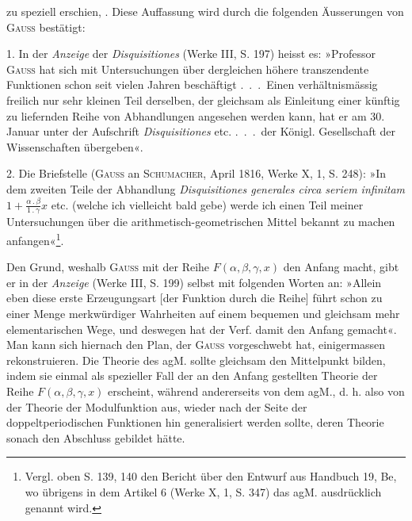 zu speziell erschien, . Diese Auffassung wird
durch die folgenden Äusserungen von \textsc{Gauss} bestätigt:
\par
1. In der \textit{Anzeige} der \textit{Disquisitiones} (Werke III, S. 197) heisst es: »Professor
\textsc{Gauss} hat sich mit Untersuchungen über dergleichen höhere transzendente
Funktionen schon seit vielen Jahren beschäftigt \mbox{.\ .\ .}\ Einen verhältnismässig
freilich nur sehr kleinen Teil derselben, der gleichsam als Einleitung
einer künftig zu liefernden Reihe von Abhandlungen angesehen werden
kann, hat er am 30. Januar unter der Aufschrift \textit{Disquisitiones} etc. \mbox{.\ .\ .}\ der
Königl. Gesellschaft der Wissenschaften übergeben«.
\par
2. Die Briefstelle (\textsc{Gauss} an \textsc{Schumacher}, April 1816, Werke X, 1, S. 248):
»In dem zweiten Teile der Abhandlung \textit{Disquisitiones generales circa seriem
infinitam} \(1+\frac{\alpha\mathbin{.}\beta}{1\mathbin{.}\gamma}x\) etc. (welche ich vielleicht bald gebe) werde ich einen Teil
meiner Untersuchungen über die arithmetisch-geometrischen Mittel bekannt
zu machen anfangen«\footnote{Vergl. oben S. 139, 140 den Bericht über den Entwurf aus Handbuch 19, Be, wo übrigens in dem Artikel 6 (Werke X, 1, S. 347) das agM. ausdrücklich genannt wird.}.
\par
Den Grund, weshalb \textsc{Gauss} mit der Reihe \(F(\alpha,\beta,\gamma,x)\) den Anfang macht,
gibt er in der \textit{Anzeige} (Werke III, S. 199) selbst mit folgenden Worten an:
»Allein eben diese erste Erzeugungsart [der Funktion durch die Reihe] führt
schon zu einer Menge merkwürdiger Wahrheiten auf einem bequemen und
gleichsam mehr elementarischen Wege, und deswegen hat der Verf. damit
den Anfang gemacht«. Man kann sich hiernach den Plan, der \textsc{Gauss} vorgeschwebt
hat, einigermassen rekonstruieren. Die Theorie des agM. sollte gleichsam
den Mittelpunkt bilden, indem sie einmal als spezieller Fall der an den
Anfang gestellten Theorie der Reihe \(F(\alpha,\beta,\gamma,x)\) erscheint, während andererseits
von dem agM., d. h. also von der Theorie der Modulfunktion aus, wieder
nach der Seite der doppeltperiodischen Funktionen hin generalisiert werden
sollte, deren Theorie sonach den Abschluss gebildet hätte.\par
{}

